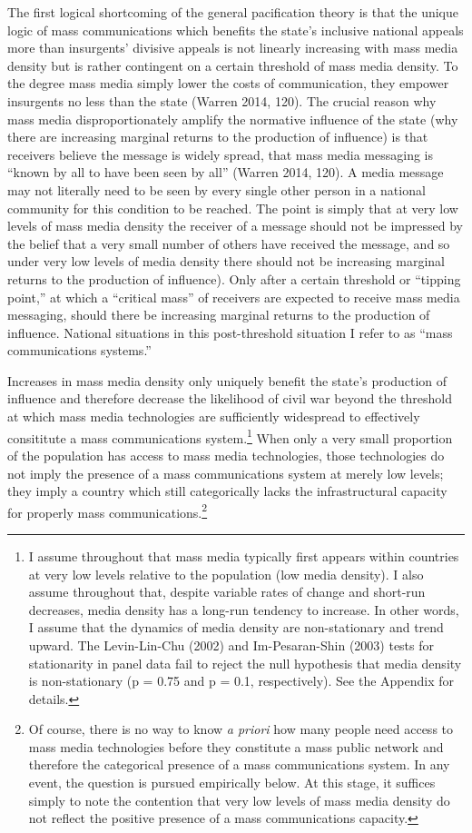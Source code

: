 \documentclass[11pt,article,oneside]{memoir}
\begin{document}
The first logical shortcoming of the general pacification theory is that
the unique logic of mass communications which benefits the state's
inclusive national appeals more than insurgents' divisive appeals is not
linearly increasing with mass media density but is rather contingent on
a certain threshold of mass media density. To the degree mass media
simply lower the costs of communication, they empower insurgents no less
than the state (Warren 2014, 120). The crucial reason why mass media
disproportionately amplify the normative influence of the state (why
there are increasing marginal returns to the production of influence) is
that receivers believe the message is widely spread, that mass media
messaging is ``known by all to have been seen by all'' (Warren 2014,
120). A media message may not literally need to be seen by every single
other person in a national community for this condition to be reached.
The point is simply that at very low levels of mass media density the
receiver of a message should not be impressed by the belief that a very
small number of others have received the message, and so under very low
levels of media density there should not be increasing marginal returns
to the production of influence). Only after a certain threshold or
``tipping point,'' at which a ``critical mass'' of receivers are
expected to receive mass media messaging, should there be increasing
marginal returns to the production of influence. National situations in
this post-threshold situation I refer to as ``mass communications
systems.''

Increases in mass media density only uniquely benefit the state's
production of influence and therefore decrease the likelihood of civil
war beyond the threshold at which mass media technologies are
sufficiently widespread to effectively consititute a mass communications
system.\footnote{I assume throughout that mass media typically first
  appears within countries at very low levels relative to the population
  (low media density). I also assume throughout that, despite variable
  rates of change and short-run decreases, media density has a long-run
  tendency to increase. In other words, I assume that the dynamics of
  media density are non-stationary and trend upward. The Levin-Lin-Chu
  (2002) and Im-Pesaran-Shin (2003) tests for stationarity in panel data
  fail to reject the null hypothesis that media density is
  non-stationary (p = 0.75 and p = 0.1, respectively). See the Appendix
  for details.} When only a very small proportion of the population has
access to mass media technologies, those technologies do not imply the
presence of a mass communications system at merely low levels; they
imply a country which still categorically lacks the infrastructural
capacity for properly mass communications.\footnote{Of course, there is
  no way to know \emph{a priori} how many people need access to mass
  media technologies before they constitute a mass public network and
  therefore the categorical presence of a mass communications system. In
  any event, the question is pursued empirically below. At this stage,
  it suffices simply to note the contention that very low levels of mass
  media density do not reflect the positive presence of a mass
  communications capacity.}
\end{document}
